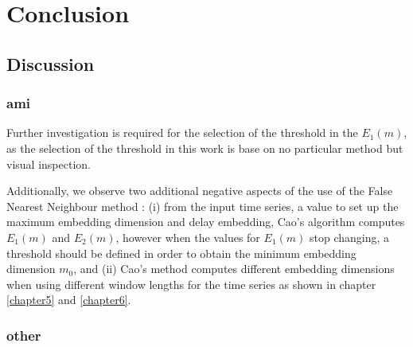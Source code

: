 
\chapter{Conclusion}

%




\section{Discussion}


\subsection{ami}


Further investigation is required for the selection of the threshold 
in the $E_1(m)$, as the selection of the threshold in this work is base on 
no particular method but visual inspection.

Additionally, we observe two additional negative aspects of the use of the 
False Nearest Neighbour method \cite{Cao1997}: 
(i) %
from the input time series, a value to set up the maximum embedding dimension 
and delay embedding, Cao's algorithm computes $E_1(m)$ and $E_2(m)$, however
when the values for $E_1(m)$ stop changing, a threshold should be 
defined in order to obtain the minimum embedding dimension $m_0$, and
(ii) Cao's method computes different embedding dimensions 
when using different window lengths for the time series as shown in chapter 
\ref{chapter5} and \ref{chapter6}.



\subsection{other}

